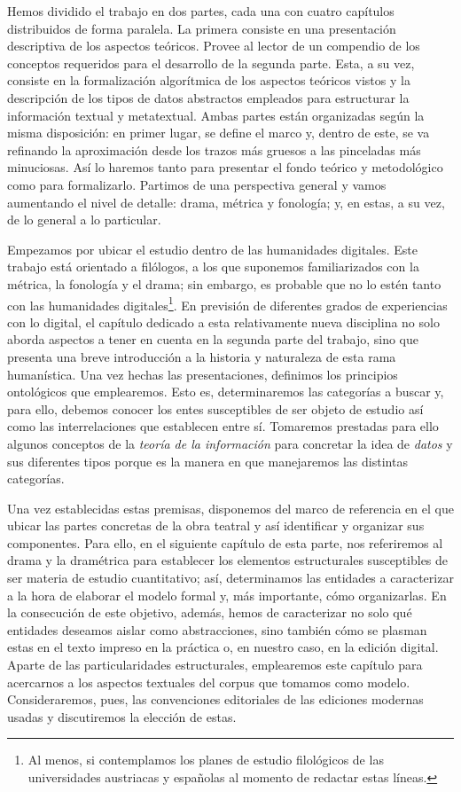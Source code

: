 Hemos dividido el trabajo en dos partes, cada una con cuatro capítulos distribuidos de forma paralela. La primera consiste en una presentación descriptiva de los aspectos teóricos. Provee al lector de un compendio de los conceptos requeridos para el desarrollo de la segunda parte. Esta, a su vez, consiste en la formalización algorítmica de los aspectos teóricos vistos y la descripción de los tipos de datos abstractos empleados para estructurar la información textual y metatextual. Ambas partes están organizadas según la misma disposición: en primer lugar, se define el marco y, dentro de este, se va refinando la aproximación desde los trazos más gruesos a las pinceladas más minuciosas. Así lo haremos tanto para presentar el fondo teórico y metodológico como para formalizarlo. Partimos de una perspectiva general y vamos aumentando el nivel de detalle: drama, métrica y fonología; y, en estas, a su vez, de lo general a lo particular.

Empezamos por ubicar el estudio dentro de las humanidades digitales. Este trabajo está orientado a filólogos, a los que suponemos familiarizados con la métrica, la fonología y el drama; sin embargo, es probable que no lo estén tanto con las humanidades digitales\footnote{Al menos, si contemplamos los planes de estudio filológicos de las universidades austriacas y españolas al momento de redactar estas líneas.}. En previsión de diferentes grados de experiencias con lo digital, el capítulo dedicado a esta relativamente nueva disciplina no solo aborda aspectos a tener en cuenta en la segunda parte del trabajo, sino que presenta una breve introducción a la historia y naturaleza de esta rama humanística. Una vez hechas las presentaciones, definimos los principios ontológicos que emplearemos. Esto es, determinaremos las categorías a buscar y, para ello, debemos conocer los entes susceptibles de ser objeto de estudio así como las interrelaciones que establecen entre sí. Tomaremos prestadas para ello algunos conceptos de la \textit{teoría de la información} para concretar la idea de \textit{datos} y sus diferentes tipos porque es la manera en que manejaremos las distintas categorías.

Una vez establecidas estas premisas, disponemos del marco de referencia en el que ubicar las partes concretas de la obra teatral y así identificar y organizar sus componentes. Para ello, en el siguiente capítulo de esta parte, nos referiremos al drama y la dramétrica para establecer los elementos estructurales susceptibles de ser materia de estudio cuantitativo; así, determinamos las entidades a caracterizar a la hora de elaborar el modelo formal y, más importante, cómo organizarlas. En la consecución de este objetivo, además, hemos de caracterizar no solo qué entidades deseamos aislar como abstracciones, sino también cómo se plasman estas en el texto impreso en la práctica  o, en nuestro caso, en la edición digital. Aparte de las particularidades estructurales, emplearemos este capítulo para acercarnos a los aspectos textuales del corpus que tomamos como modelo. Consideraremos, pues, las convenciones editoriales de las ediciones modernas usadas y discutiremos la elección de estas.

